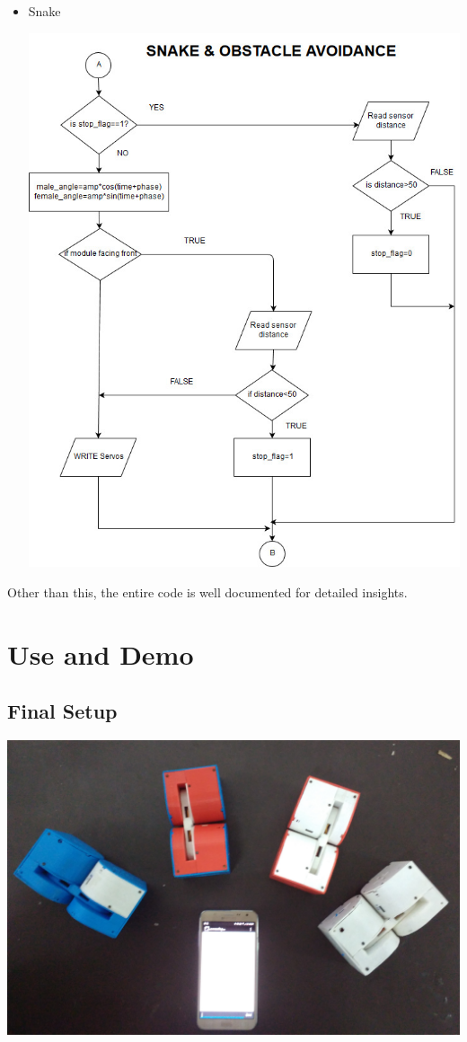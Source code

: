 \documentclass[a4paper,12pt,oneside]{book}
\begin{document}
\begin{itemize}
\item Snake \\
\begin{center}
 \includegraphics[scale=0.5]{snake_flow2.jpg}
\end{center}

\end{itemize}

\noindent Other than this, the entire code is well documented for detailed insights.

\pagebreak

\section{Use and Demo}
\subsection{Final Setup}
\includegraphics[scale=0.09]{final_setup.jpg}
\end{document}
